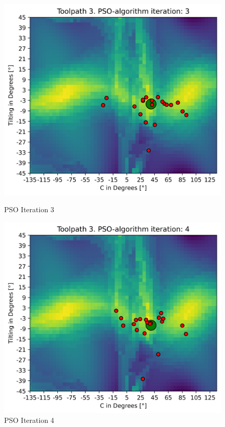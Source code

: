 \begin{figure}[H]	
	\centering
	\begin{minipage}{0.5\textwidth}
		\includegraphics[width=\textwidth]{figures/swarm_true/3_3.png}
		\caption{PSO Iteration 3}
		\label{3_true}
	\end{minipage}\hfill
	\begin{minipage}{0.5\textwidth}
		\includegraphics[width=\textwidth]{figures/swarm_true/3_4.png}
		\caption{PSO Iteration 4}
		\label{4_true}
	\end{minipage}\par
\end{figure}

